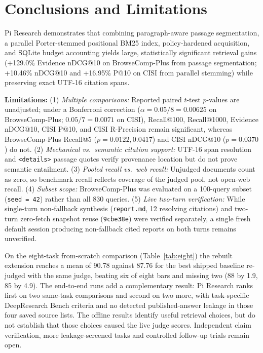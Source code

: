 \documentclass[conference]{IEEEtran}
\begin{document}
\section{Conclusions and Limitations}

Pi Research demonstrates that combining paragraph-aware passage segmentation, a parallel Porter-stemmed positional BM25 index, policy-hardened acquisition, and SQLite budget accounting yields large, statistically significant retrieval gains (+129.0\% Evidence nDCG@10 on BrowseComp-Plus from passage segmentation; +10.46\% nDCG@10 and +16.95\% P@10 on CISI from parallel stemming) while preserving exact UTF-16 citation spans.

\textbf{Limitations:} (1) \textit{Multiple comparisons:} Reported paired $t$-test $p$-values are unadjusted; under a Bonferroni correction ($\alpha = 0.05/8 = 0.00625$ on BrowseComp-Plus; $0.05/7 = 0.0071$ on CISI), Recall@100, Recall@1000, Evidence nDCG@10, CISI P@10, and CISI R-Precision remain significant, whereas BrowseComp-Plus Recall@5 ($p = 0.0122, 0.0417$) and CISI nDCG@10 ($p = 0.0370$) do not. (2) \textit{Mechanical vs.\ semantic citation support:} UTF-16 span resolution and \texttt{<details>} passage quotes verify provenance location but do not prove semantic entailment. (3) \textit{Pooled recall vs.\ web recall:} Unjudged documents count as zero, so benchmark recall reflects coverage of the judged pool, not open-web recall. (4) \textit{Subset scope:} BrowseComp-Plus was evaluated on a 100-query subset (\texttt{seed = 42}) rather than all 830 queries. (5) \textit{Live two-turn verification:} While single-turn non-fallback synthesis (\texttt{report.md}, 12 resolving citations) and two-turn zero-fetch snapshot reuse (\texttt{9cbe38e}) were verified separately, a single fresh default session producing non-fallback cited reports on both turns remains unverified.

On the eight-task from-scratch comparison (Table~\ref{tab:eight}) the rebuilt extension reaches a mean of 90.78 against 87.76 for the best shipped baseline re-judged with the same judge, beating six of eight bars and missing two (88 by 1.9, 85 by 4.9). The end-to-end runs add a complementary result: Pi Research ranks first on two same-task comparisons and second on two more, with task-specific DeepResearch Bench criteria and no detected published-answer leakage in those four saved source lists. The offline results identify useful retrieval choices, but do not establish that those choices caused the live judge scores. Independent claim verification, more leakage-screened tasks and controlled follow-up trials remain open.
\end{document}
